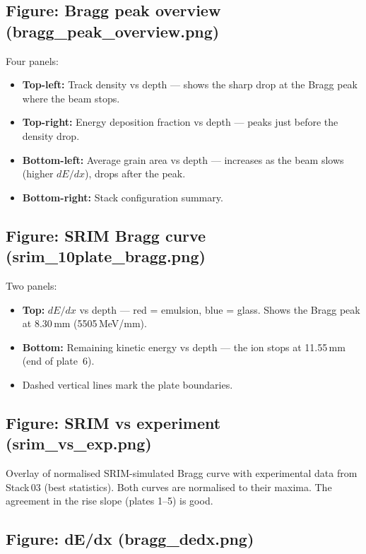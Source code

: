 \documentclass[12pt,a4paper]{article}
\begin{document}
\subsection{Figure: Bragg peak overview (bragg\_peak\_overview.png)}

Four panels:
\begin{itemize}
  \item \textbf{Top-left:} Track density vs depth --- shows the sharp
        drop at the Bragg peak where the beam stops.
  \item \textbf{Top-right:} Energy deposition fraction vs depth ---
        peaks just before the density drop.
  \item \textbf{Bottom-left:} Average grain area vs depth --- increases
        as the beam slows (higher $dE/dx$), drops after the peak.
  \item \textbf{Bottom-right:} Stack configuration summary.
\end{itemize}

\subsection{Figure: SRIM Bragg curve (srim\_10plate\_bragg.png)}

Two panels:
\begin{itemize}
  \item \textbf{Top:} $dE/dx$ vs depth --- red = emulsion, blue = glass.
        Shows the Bragg peak at 8.30\,mm (5505\,MeV/mm).
  \item \textbf{Bottom:} Remaining kinetic energy vs depth --- the ion
        stops at 11.55\,mm (end of plate~6).
  \item Dashed vertical lines mark the plate boundaries.
\end{itemize}

\subsection{Figure: SRIM vs experiment (srim\_vs\_exp.png)}

Overlay of normalised SRIM-simulated Bragg curve with experimental
data from Stack\,03 (best statistics). Both curves are normalised to
their maxima. The agreement in the rise slope (plates 1--5) is good.

\subsection{Figure: dE/dx (bragg\_dedx.png)}
\end{document}
